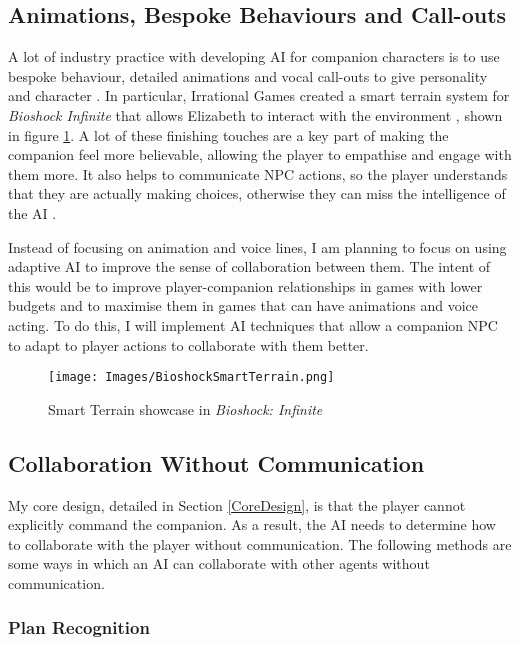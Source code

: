\documentclass{IEEEtran}
\begin{document}
\subsection{Animations, Bespoke Behaviours and Call-outs}
\label{ABC}

A lot of industry practice with developing AI for companion characters is to use bespoke behaviour, detailed animations and vocal call-outs to give personality and character \cite{GAIP2EllieAI, GMTGoodAI, GAIPOReactions}. In particular, Irrational Games created a smart terrain system for \textit{Bioshock Infinite} that allows Elizabeth to interact with the environment \cite{GDCElizabeth, AIGamesBioshockAI}, shown in figure \ref{fig:BioshockSmartTerrain}. A lot of these finishing touches are a key part of making the companion feel more believable, allowing the player to empathise and engage with them more. It also helps to communicate NPC actions, so the player understands that they are actually making choices, otherwise they can miss the intelligence of the AI \cite{GMTGoodAI}.

Instead of focusing on animation and voice lines, I am planning to focus on using adaptive AI to improve the sense of collaboration between them. The intent of this would be to improve player-companion relationships in games with lower budgets and to maximise them in games that can have animations and voice acting. To do this, I will implement AI techniques that allow a companion NPC to adapt to player actions to collaborate with them better.

\begin{figure}
  \centering
  \texttt{[image: Images/BioshockSmartTerrain.png]}
  
\caption{Smart Terrain showcase in \textit{Bioshock: Infinite}}
\label{fig:BioshockSmartTerrain}
\end{figure}

\subsection{Collaboration Without Communication}
\label{Communication}

My core design, detailed in Section \ref{CoreDesign}, is that the player cannot explicitly command the companion. As a result, the AI needs to determine how to collaborate with the player without communication. The following methods are some ways in which an AI can collaborate with other agents without communication.

\subsubsection{Plan Recognition}
\label{PlanRecognition}
\end{document}
